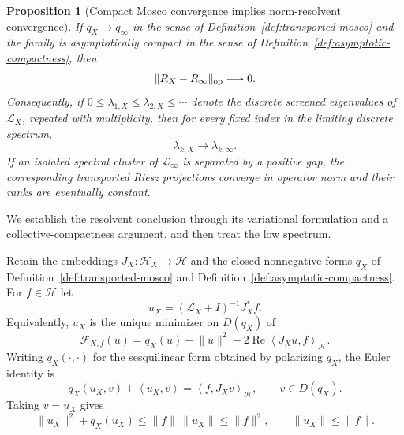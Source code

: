\documentclass[11pt]{article}
\numberwithin{equation}{section}
\newtheorem{proposition}[theorem]{Proposition}
\theoremstyle{definition}
\theoremstyle{remark}
\newcommand{\norm}[1]{\lVert#1\rVert}
\newcommand{\ip}[2]{\left\langle#1,#2\right\rangle}
\begin{document}
\begin{proposition}[Compact Mosco convergence implies norm-resolvent convergence]
\label{prop:compact-mosco-resolvent}
If $q_X\to q_\infty$ in the sense of
Definition~\ref{def:transported-mosco} and the family is asymptotically
compact in the sense of Definition~\ref{def:asymptotic-compactness}, then
\begin{equation}
\norm{R_X-R_\infty}_{\rm op}\longrightarrow0.
\label{eq:norm-resolvent}
\end{equation}
Consequently, if
$0\le\lambda_{1,X}\le\lambda_{2,X}\le\cdots$ denote the discrete screened
eigenvalues of $\mathscr L_X$, repeated with multiplicity, then for every
fixed index in the limiting discrete spectrum,
\begin{equation}
\lambda_{k,X}\longrightarrow\lambda_{k,\infty}.
\label{eq:eigenvalue-convergence}
\end{equation}
If an isolated spectral cluster of $\mathscr L_\infty$ is separated by a
positive gap, the corresponding transported Riesz projections converge in
operator norm and their ranks are eventually constant.
\end{proposition}

We establish the resolvent conclusion through its variational formulation
and a collective-compactness argument, and then treat the low spectrum.

Retain the embeddings $J_X:\mathscr H_X\to\mathscr H$ and the closed
nonnegative forms $q_X$ of Definition~\ref{def:transported-mosco} and Definition~\ref{def:asymptotic-compactness}.  For $f\in\mathscr H$ let
\begin{equation}
u_X=(\mathscr L_X+I)^{-1}J_X^*f.
\label{eq:resolvent-minimizer}
\end{equation}
Equivalently, $u_X$ is the unique minimizer on $D(q_X)$ of
\begin{equation}
\mathcal F_{X,f}(u)
=q_X(u)+\norm{u}^2-2\operatorname{Re}\ip{J_Xu}{f}_{\mathscr H}.
\label{eq:resolvent-functional}
\end{equation}
Writing $q_X(\cdot,\cdot)$ for the sesquilinear form obtained by polarizing
$q_X$, the Euler identity is
\begin{equation}
q_X(u_X,v)+\ip{u_X}{v}
=\ip{f}{J_Xv}_{\mathscr H},
\qquad v\in D(q_X).
\label{eq:resolvent-euler}
\end{equation}
Taking $v=u_X$ gives
\begin{equation}
\norm{u_X}^2+q_X(u_X)
\le \norm{f}\,\norm{u_X}
\le \norm{f}^2,
\qquad
\norm{u_X}\le\norm f.
\label{eq:resolvent-energy-bound}
\end{equation}
\end{document}
